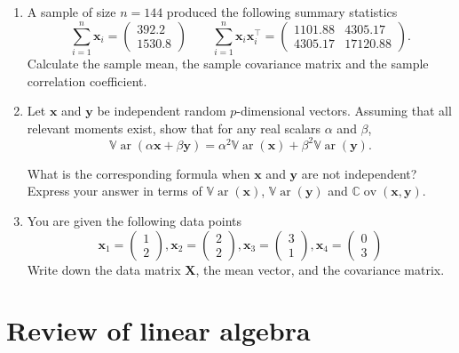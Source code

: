 \documentclass[
]{book}
\theoremstyle{definition}
\theoremstyle{definition}
\theoremstyle{definition}
\theoremstyle{definition}
\theoremstyle{remark}
\begin{document}
\begin{enumerate}
\def\labelenumi{\arabic{enumi}.}
\setcounter{enumi}{2}
\item
  A sample of size \(n=144\) produced the following summary statistics
  \[ \sum_{i=1}^n \mathbf x_i = \begin{pmatrix} 392.2 \\ 1530.8 \end{pmatrix} \qquad \sum_{i=1}^n \mathbf x_i \mathbf x_i^\top = \begin{pmatrix} 1101.88 & 4305.17 \\ 4305.17 & 17120.88 \end{pmatrix}.\]
  Calculate the sample mean, the sample covariance matrix and the sample correlation coefficient.
\item
  Let \(\mathbf x\) and \(\mathbf y\) be independent random \(p\)-dimensional vectors. Assuming that all relevant moments exist, show that for any real scalars \(\alpha\) and \(\beta\),
  \[{\mathbb{V}\operatorname{ar}}(\alpha \mathbf x+ \beta \mathbf y) = \alpha^2 {\mathbb{V}\operatorname{ar}}(\mathbf x) + \beta^2 {\mathbb{V}\operatorname{ar}}(\mathbf y).\]

  What is the corresponding formula when \(\mathbf x\) and \(\mathbf y\) are not independent? Express your answer in terms of \({\mathbb{V}\operatorname{ar}}(\mathbf x)\), \({\mathbb{V}\operatorname{ar}}(\mathbf y)\) and \({\mathbb{C}\operatorname{ov}}(\mathbf x, \mathbf y)\).
\item
  You are given the following data points
  \[\mathbf x_1 = \begin{pmatrix} 1\\ 2\end{pmatrix}, \mathbf x_2 = \begin{pmatrix} 2 \\ 2\end{pmatrix}, \mathbf x_3 = \begin{pmatrix} 3\\ 1\end{pmatrix}, \mathbf x_4 = \begin{pmatrix} 0 \\3\end{pmatrix}\]
  Write down the data matrix \(\mathbf X\), the mean vector, and the covariance matrix.
\end{enumerate}

\chapter{Review of linear algebra}\label{linalg-prelim}
\end{document}
